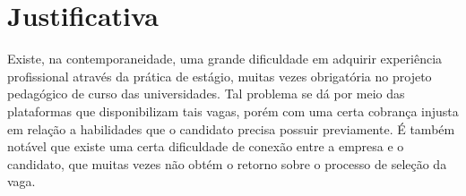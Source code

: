 \section{Justificativa}
Existe, na contemporaneidade, uma grande dificuldade em adquirir experiência profissional através da prática de estágio, muitas vezes obrigatória no projeto pedagógico de curso das universidades. Tal problema se dá por meio das plataformas que disponibilizam tais vagas, porém com uma certa cobrança injusta em relação a habilidades que o candidato precisa possuir previamente. É também notável que existe uma certa dificuldade de conexão entre a empresa e o candidato, que muitas vezes não obtém o retorno sobre o processo de seleção da vaga.